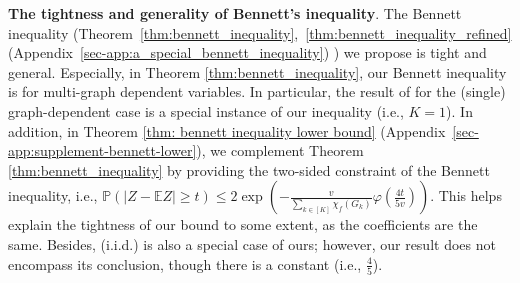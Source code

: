 \documentclass{article}
\def\eE{\mathbb{E}}
\def\pP{\mathbb{P}}
\begin{document}



\textbf{The tightness and generality of Bennett's inequality}. The Bennett inequality (Theorem~\ref{thm:bennett_inequality},~\ref{thm:bennett_inequality_refined} (Appendix~\ref{sec-app:a_special_bennett_inequality}) ) we propose is tight and general. 
Especially, in Theorem \ref{thm:bennett_inequality}, 
our Bennett inequality is for multi-graph dependent variables. 
In particular, the result of \cite{ralaivola2015entropy} for the (single) graph-dependent case is a special instance of our inequality (i.e., \( K=1 \)). In addition, in Theorem \ref{thm: bennett inequality lower bound} (Appendix~\ref{sec-app:supplement-bennett-lower}), we complement Theorem \ref{thm:bennett_inequality} by providing the two-sided constraint of the Bennett inequality, i.e., $\pP(|Z-\eE Z| \geq t) \leq 2 \exp (-\frac{v}{\sum_{k \in [K]} \chi_f(G_k)} \varphi(\frac{4t}{5v}))$. This helps explain the tightness of our bound to some extent, as the coefficients are the same. Besides, \cite{Bartlett_2005} (i.i.d.) is also a special case of ours; however, our result does not encompass its conclusion, though there is a constant (i.e., \( \frac{4}{5} \)). 
\end{document}
